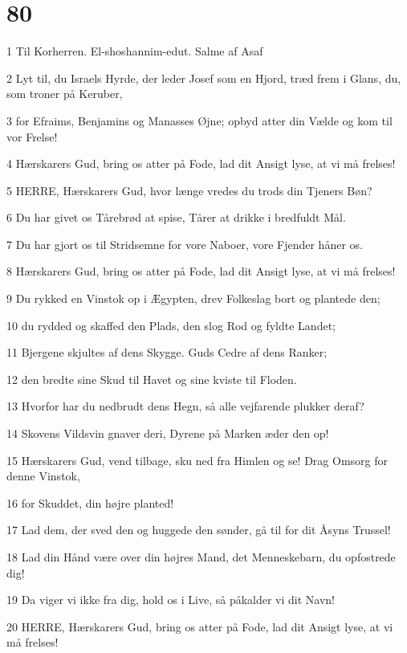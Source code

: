 \chapter{80}

\par 1 Til Korherren. El-shoshannim-edut. Salme af Asaf
\par 2 Lyt til, du Israels Hyrde, der leder Josef som en Hjord, træd frem i Glans, du, som troner på Keruber,
\par 3 for Efraims, Benjamins og Manasses Øjne; opbyd atter din Vælde og kom til vor Frelse!
\par 4 Hærskarers Gud, bring os atter på Fode, lad dit Ansigt lyse, at vi må frelses!
\par 5 HERRE, Hærskarers Gud, hvor længe vredes du trods din Tjeners Bøn?
\par 6 Du har givet os Tårebrød at spise, Tårer at drikke i bredfuldt Mål.
\par 7 Du har gjort os til Stridsemne for vore Naboer, vore Fjender håner os.
\par 8 Hærskarers Gud, bring os atter på Fode, lad dit Ansigt lyse, at vi må frelses!
\par 9 Du rykked en Vinstok op i Ægypten, drev Folkeslag bort og plantede den;
\par 10 du rydded og skaffed den Plads, den slog Rod og fyldte Landet;
\par 11 Bjergene skjultes af dens Skygge. Guds Cedre af dens Ranker;
\par 12 den bredte sine Skud til Havet og sine kviste til Floden.
\par 13 Hvorfor har du nedbrudt dens Hegn, så alle vejfarende plukker deraf?
\par 14 Skovens Vildsvin gnaver deri, Dyrene på Marken æder den op!
\par 15 Hærskarers Gud, vend tilbage, sku ned fra Himlen og se! Drag Omsorg for denne Vinstok,
\par 16 for Skuddet, din højre planted!
\par 17 Lad dem, der sved den og huggede den sønder, gå til for dit Åsyns Trussel!
\par 18 Lad din Hånd være over din højres Mand, det Menneskebarn, du opfostrede dig!
\par 19 Da viger vi ikke fra dig, hold os i Live, så påkalder vi dit Navn!
\par 20 HERRE, Hærskarers Gud, bring os atter på Fode, lad dit Ansigt lyse, at vi må frelses!

